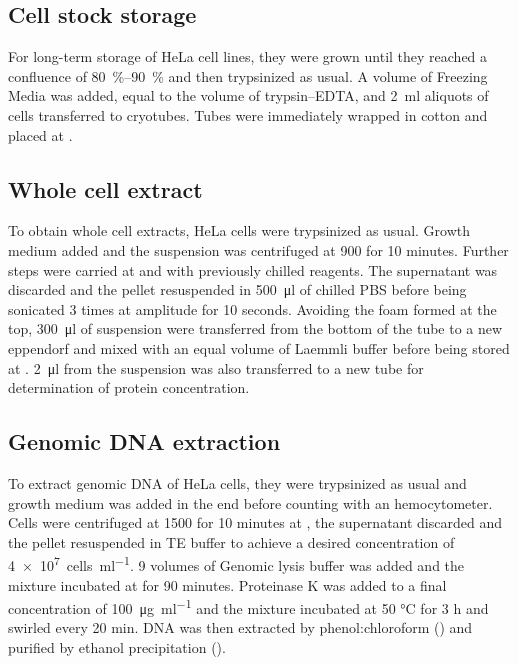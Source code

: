   \subsection{Cell stock storage}
    For long-term storage of HeLa cell lines, they were grown until they reached
    a confluence of \SIrange{80}{90}{\percent} and then trypsinized as usual. A volume of Freezing
    Media was added, equal to the volume of trypsin--EDTA, and \SI{2}{\ml} aliquots of
    cells transferred to cryotubes. Tubes were immediately wrapped in cotton and
    placed at .

  \subsection{Whole cell extract}
    \label{sec:cell-extract}
    To obtain whole cell extracts, HeLa cells were trypsinized as usual. Growth
    medium added and the suspension was centrifuged at \SI{900}{\gn} for 10 minutes. Further
    steps were carried at  and with previously chilled reagents. The supernatant
    was discarded and the pellet resuspended in \SI{500}{\ul} of chilled PBS before being
    sonicated 3 times at  amplitude for 10 seconds. Avoiding the foam formed at
    the top, \SI{300}{\ul} of suspension were transferred from the bottom of the tube to a
    new eppendorf and mixed with an equal volume of Laemmli buffer before being
    stored at . \SI{2}{\ul} from the suspension was also transferred to a new tube
    for determination of protein concentration.

  \subsection{Genomic DNA extraction}
    To extract genomic DNA of HeLa cells, they were trypsinized as usual and
    growth medium was added in the end before counting with an hemocytometer.
    Cells were centrifuged at \SI{1500}{\gn} for 10 minutes at , the supernatant discarded
    and the pellet resuspended in TE buffer to achieve a desired concentration of
    \SI{4e7}{cells\per\ml}. 9 volumes of Genomic lysis buffer was added and the mixture
    incubated at  for 90 minutes. Proteinase K was added to a final concentration of
    \SI{100}{\ug\per\ml} and the mixture incubated at 50 °C for 3 h and swirled every 20 min.
    DNA was then extracted by phenol:chloroform () and purified by ethanol
    precipitation ().

